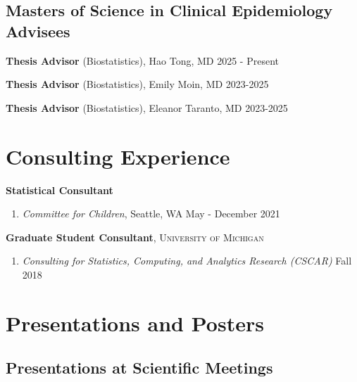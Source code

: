\documentclass[letterpaper,11pt]{article} %
\begin{document}
    \subsection*{Masters of Science in Clinical Epidemiology Advisees}
    \begin{etaremune}
        \item \textbf{Thesis Advisor} (Biostatistics), Hao Tong, MD \hfill 2025 - Present
        \item \textbf{Thesis Advisor} (Biostatistics), Emily Moin, MD \hfill 2023-2025
        \item \textbf{Thesis Advisor} (Biostatistics), Eleanor Taranto, MD \hfill 2023-2025
    \end{etaremune}
	
\section*{Consulting Experience}
		\noindent \textbf{Statistical Consultant}
		\begin{enumerate}
			\item \textit{Committee for Children}, Seattle, WA \hfill May - December 2021
		\end{enumerate}
		
		\noindent \textbf{Graduate Student Consultant}, \textsc{University of Michigan} 
		\begin{enumerate}
			\item \textit{Consulting for Statistics, Computing, and Analytics Research (CSCAR)} \hfill Fall 2018 
		\end{enumerate}
		 
		 
	\section*{Presentations and Posters}
	
	\subsection*{Presentations at Scientific Meetings}
\end{document}
